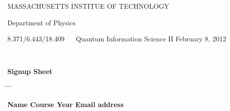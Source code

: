 \documentclass[amsfonts,preprint,pra,12pt]{ikedoc3}
\begin{document}
\thispagestyle{empty}

\centerline{\large MASSACHUSETTS INSTITUE OF TECHNOLOGY}
\vspace*{1ex}
\centerline{\large Department of Physics}
\vspace*{1ex}

\noindent
{\large 8.371/6.443/18.409 \hfill~~ Quantum Information Science II
 \hfill February 8, 2012}

~\\
\centerline{\large \bf Signup Sheet}

\vspace*{4ex}

\renewcommand{\u}[1]{\underline{\hspace*{#1}}}


\begin{tabbing}
\hspace*{44ex} \= \hspace*{14ex} \= \hspace*{14ex} \= \hspace*{44ex} \kill

\Large\bf
Name \> \Large\bf Course \> \Large\bf Year \> 
\Large\bf Email address \\[6ex]
\u{40ex} \> \u{10ex} \> \u{10ex} \> \u{40ex} \\[5.25ex]
\u{40ex} \> \u{10ex} \> \u{10ex} \> \u{40ex} \\[5.25ex]
\u{40ex} \> \u{10ex} \> \u{10ex} \> \u{40ex} \\[5.25ex]
\u{40ex} \> \u{10ex} \> \u{10ex} \> \u{40ex} \\[5.25ex]
\u{40ex} \> \u{10ex} \> \u{10ex} \> \u{40ex} \\[5.25ex]
\u{40ex} \> \u{10ex} \> \u{10ex} \> \u{40ex} \\[5.25ex]
\u{40ex} \> \u{10ex} \> \u{10ex} \> \u{40ex} \\[5.25ex]
\u{40ex} \> \u{10ex} \> \u{10ex} \> \u{40ex} \\[5.25ex]
\u{40ex} \> \u{10ex} \> \u{10ex} \> \u{40ex} \\[5.25ex]
\u{40ex} \> \u{10ex} \> \u{10ex} \> \u{40ex} \\[5.25ex]
\u{40ex} \> \u{10ex} \> \u{10ex} \> \u{40ex} \\[5.25ex]
\u{40ex} \> \u{10ex} \> \u{10ex} \> \u{40ex} \\[5.25ex]
\u{40ex} \> \u{10ex} \> \u{10ex} \> \u{40ex} \\[5.25ex]
\end{tabbing}

\end{document}
